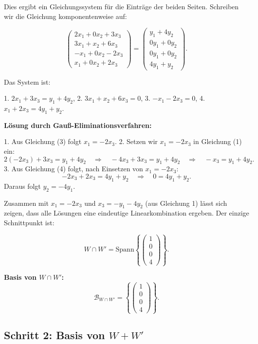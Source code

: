 \documentclass[11pt]{article}
\begin{document}
Dies ergibt ein Gleichungssystem für die Einträge der beiden Seiten. Schreiben wir die Gleichung komponentenweise auf:

\[
\begin{pmatrix} 2x_1 + 0x_2 + 3x_3 \\ 3x_1 + x_2 + 6x_3 \\ -x_1 + 0x_2 - 2x_3 \\ x_1 + 0x_2 + 2x_3 \end{pmatrix}
=
\begin{pmatrix} y_1 + 4y_2 \\ 0y_1 + 0y_2 \\ 0y_1 + 0y_2 \\ 4y_1 + y_2 \end{pmatrix}.
\]

Das System ist:

1. \( 2x_1 + 3x_3 = y_1 + 4y_2 \),
2. \( 3x_1 + x_2 + 6x_3 = 0 \),
3. \( -x_1 - 2x_3 = 0 \),
4. \( x_1 + 2x_3 = 4y_1 + y_2 \).

\textbf{Lösung durch Gauß-Eliminationsverfahren:}

1. Aus Gleichung (3) folgt \( x_1 = -2x_3 \).
2. Setzen wir \( x_1 = -2x_3 \) in Gleichung (1) ein:
   \[
   2(-2x_3) + 3x_3 = y_1 + 4y_2 \quad \Rightarrow \quad -4x_3 + 3x_3 = y_1 + 4y_2 \quad \Rightarrow \quad -x_3 = y_1 + 4y_2.
   \]
3. Aus Gleichung (4) folgt, nach Einsetzen von \( x_1 = -2x_3 \):
   \[
   -2x_3 + 2x_3 = 4y_1 + y_2 \quad \Rightarrow \quad 0 = 4y_1 + y_2.
   \]
   Daraus folgt \( y_2 = -4y_1 \).

Zusammen mit \( x_1 = -2x_3 \) und \( x_3 = -y_1 - 4y_2 \) (aus Gleichung 1) lässt sich zeigen, dass alle Lösungen eine eindeutige Linearkombination ergeben. Der einzige Schnittpunkt ist:

\[
W \cap W' = \text{Spann} \left\{ \begin{pmatrix} 1 \\ 0 \\ 0 \\ 4 \end{pmatrix} \right\}.
\]

\textbf{Basis von \( W \cap W' \):}
\[
\mathcal{B}_{W \cap W'} = \left\{ \begin{pmatrix} 1 \\ 0 \\ 0 \\ 4 \end{pmatrix} \right\}.
\]

\subsection*{Schritt 2: Basis von \( W + W' \)}
\end{document}
